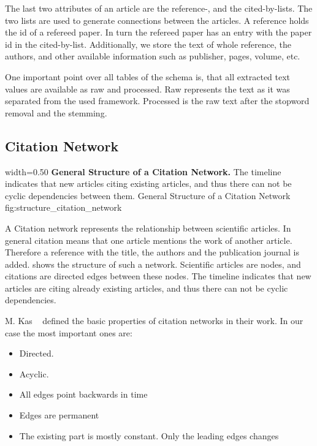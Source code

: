 The last two attributes of an article are the reference-, and the cited-by-lists. The two lists are used to generate connections between the articles. A reference holds the id of a refereed paper. In turn the refereed paper has an entry with the paper id in the cited-by-list. Additionally, we store the text of whole reference, the authors, and other available information such as publisher, pages, volume, etc.

One important point over all tables of the schema is, that all extracted text values are available as raw and processed. Raw represents the text as it was separated from the used framework. Processed is the raw text after the stopword removal and the stemming.

\subsection{Citation Network}
\label{sec:citation_network}

      {width=0.50\textwidth}
      {\textbf{General Structure of a Citation Network.} The timeline indicates that new articles citing existing articles, and thus there can not be cyclic dependencies between them.}
      {General Structure of a Citation Network}
      {fig:structure_citation_network}

A Citation network represents the relationship between scientific articles. In general citation means that one article mentions the work of another article. Therefore a
reference with the title, the authors and the publication journal is added.  shows the structure of such a network. Scientific articles are nodes, and citations are directed edges between these nodes. The timeline indicates that new articles are citing already existing articles, and thus there can not be cyclic dependencies.

M. Kas ~\cite{kas2011} defined the basic properties of citation networks in their work. In our case the most important ones are:

\begin{itemize}
  \item Directed.
  \item Acyclic.
  \item All edges point backwards in time
  \item Edges are permanent
  \item The existing part is mostly constant. Only the leading edges changes
\end{itemize}

